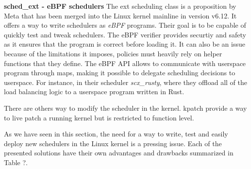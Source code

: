 \par \textbf{sched\_ext - eBPF schedulers} The ext scheduling\cite{schedext} class is a proposition by Meta that has been merged into the Linux kernel mainline in version v6.12. It offers a way to write schedulers as \textit{eBPF} programs. Their goal is to be capable of quickly test and tweak schedulers. The eBPF verifier provides securtiy and safety as it ensures that the program is correct before loading it. It can also be an issue because of the limitations it imposes, policies must heavily rely on helper functions that they define. The eBPF API allows to communicate with userspace program through maps, making it possible to delegate scheduling decisions to userspace. For instance, in their scheduler \textit{scx\_rusty}, where they offload all of the load balancing logic to a userspace program written in Rust.\newline

\par There are others way to modify the scheduler in the kernel. kpatch\cite{} provide a way to live patch a running kernel but is restricted to function level. 
\par As we have seen in this section, the need for a way to write, test and easily deploy new schedulers in the Linux kernel is a pressing issue. Each of the presented solutions have their own advantages and drawbacks summarized in Table ?.